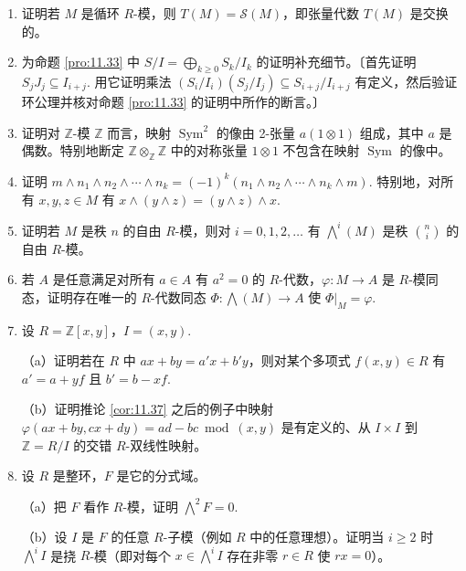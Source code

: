 \begin{enumerate}
\item 证明若 \(M\) 是循环 \(R\)-模，则 \(T(M) = \mathcal{S}(M)\)，即张量代数 \(T(M)\) 是交换的。

\item 为命题 \ref{pro:11.33} 中 \(S/I = \bigoplus_{k \geq 0}S_k/I_k\) 的证明补充细节。〔首先证明 \(S_jJ_j \subseteq I_{i+j}\). 用它证明乘法 \((S_i/I_i)(S_j/I_j) \subseteq S_{i+j}/I_{i+j}\) 有定义，然后验证环公理并核对命题 \ref{pro:11.33} 的证明中所作的断言。〕

\item 证明对 \(\mathbb{Z}\)-模 \(\mathbb{Z}\) 而言，映射 \(\operatorname{Sym}^2\) 的像由 2-张量 \(a(1 \otimes 1)\) 组成，其中 \(a\) 是偶数。特别地断定 \(\mathbb{Z} \otimes_{\mathbb{Z}} \mathbb{Z}\) 中的对称张量 \(1 \otimes 1\) 不包含在映射 \(\operatorname{Sym}\) 的像中。

\item 证明 \(m \wedge n_1 \wedge n_2 \wedge \cdots \wedge n_k = (-1)^k(n_1 \wedge n_2 \wedge \cdots \wedge n_k \wedge m)\). 特别地，对所有 \(x, y, z \in M\) 有 \(x \wedge (y \wedge z) = (y \wedge z) \wedge x\).

\item 证明若 \(M\) 是秩 \(n\) 的自由 \(R\)-模，则对 \(i = 0, 1, 2, \ldots\) 有 \(\bigwedge^i(M)\) 是秩 \(\binom{n}{i}\) 的自由 \(R\)-模。

\item 若 \(A\) 是任意满足对所有 \(a \in A\) 有 \(a^2 = 0\) 的 \(R\)-代数，\(\varphi : M \to A\) 是 \(R\)-模同态，证明存在唯一的 \(R\)-代数同态 \(\Phi : \bigwedge(M) \to A\) 使 \(\Phi|_M = \varphi\).

\item 设 \(R = \mathbb{Z}[x, y]\)，\(I = (x, y)\).

（a）证明若在 \(R\) 中 \(ax+by = a'x+b'y\)，则对某个多项式 \(f(x, y) \in R\) 有 \(a' = a+yf\) 且 \(b' = b-xf\).

（b）证明推论 \ref{cor:11.37} 之后的例子中映射 \(\varphi(ax+by, cx+dy) = ad-bc \bmod (x, y)\) 是有定义的、从 \(I \times I\) 到 \(\mathbb{Z} = R/I\) 的交错 \(R\)-双线性映射。

\item 设 \(R\) 是整环，\(F\) 是它的分式域。

（a）把 \(F\) 看作 \(R\)-模，证明 \(\bigwedge^2 F = 0\).

（b）设 \(I\) 是 \(F\) 的任意 \(R\)-子模（例如 \(R\) 中的任意理想）。证明当 \(i \geq 2\) 时 \(\bigwedge^i I\) 是挠 \(R\)-模（即对每个 \(x \in \bigwedge^i I\) 存在非零 \(r \in R\) 使 \(rx = 0\)）。


\end{enumerate}
